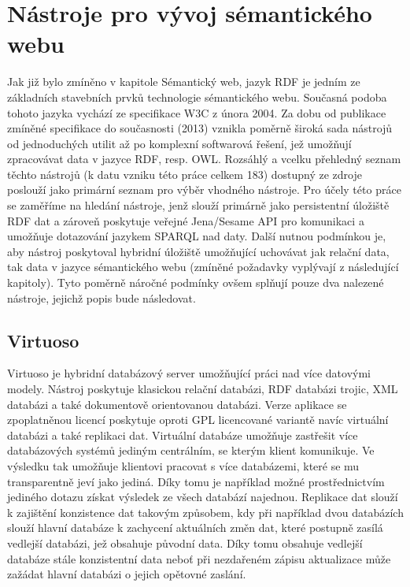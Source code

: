 \documentclass{projekt}
\begin{document}
\chapter{Nástroje pro vývoj sémantického webu}
\hspace{0.65cm}Jak již bylo zmíněno v kapitole Sémantický web, jazyk RDF je jedním ze základních stavebních prvků  technologie sémantického webu. Současná podoba tohoto jazyka vychází ze specifikace W3C \cite{_6} z února 2004. Za dobu od publikace zmíněné specifikace do současnosti (2013) vznikla poměrně široká sada nástrojů od jednoduchých utilit až po komplexní softwarová řešení, jež umožňují zpracovávat data v jazyce RDF, resp. OWL. Rozsáhlý a vcelku přehledný seznam těchto nástrojů (k datu vzniku této práce celkem 183) dostupný ze zdroje  \cite{_23} poslouží jako primární seznam pro výběr vhodného nástroje. Pro účely této práce se zaměříme na hledání nástroje, jenž slouží primárně jako persistentní úložiště RDF dat a zároveň poskytuje veřejné Jena/Sesame API pro  komunikaci a umožňuje dotazování jazykem SPARQL nad daty. Další nutnou podmínkou je, aby nástroj poskytoval hybridní úložiště umožňující uchovávat jak relační data, tak data v jazyce sémantického webu (zmíněné požadavky vyplývají z následující kapitoly). Tyto poměrně náročné podmínky ovšem splňují pouze dva nalezené nástroje, jejichž popis bude následovat.

\section{Virtuoso}
\hspace{0.65cm}Virtuoso je hybridní databázový server umožňující práci nad více datovými modely. Nástroj poskytuje klasickou relační databázi, RDF databázi trojic, XML databázi a také dokumentově orientovanou databázi. Verze aplikace se zpoplatněnou licencí poskytuje oproti GPL licencované variantě navíc virtuální databázi a také replikaci dat. Virtuální databáze umožňuje zastřešit více databázových systémů jediným centrálním, se kterým klient komunikuje. Ve výsledku tak umožňuje klientovi pracovat s více databázemi, které se mu transparentně jeví jako jediná. Díky tomu je například možné prostřednictvím jediného dotazu získat výsledek ze všech databází najednou. Replikace dat slouží  k zajištění konzistence dat takovým způsobem, kdy při například dvou databázích slouží hlavní databáze k zachycení aktuálních změn dat, které postupně zasílá vedlejší databázi, jež obsahuje původní data. Díky tomu obsahuje vedlejší databáze stále konzistentní data neboť při nezdařeném zápisu aktualizace může zažádat hlavní databázi o jejich opětovné zaslání. 
\end{document}
